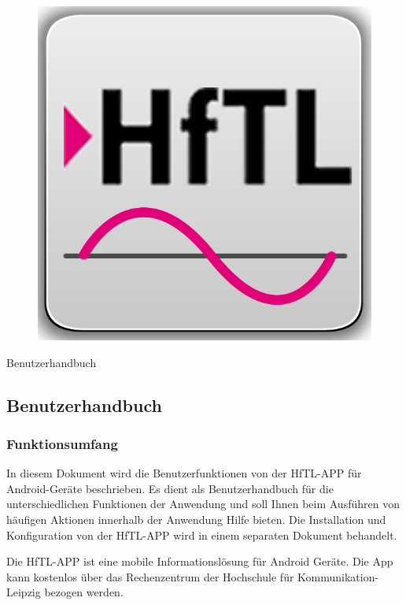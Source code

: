 \begin{figure}[h]
	\centering
	\includegraphics[scale=2.5]{03_Bedienungsanleitung/img/Logo_HFTl_App.png}
	\label{img:grafik-dummy}
\end{figure}

\begin{center}
{\huge Benutzerhandbuch}
\end{center}


\newpage
\subsection{Benutzerhandbuch}
\subsubsection{Funktionsumfang}
In diesem Dokument wird die Benutzerfunktionen von der HfTL-APP für
Android-Geräte beschrieben. Es dient als Benutzerhandbuch für die
unterschiedlichen Funktionen der Anwendung und soll Ihnen beim
Ausführen von häufigen Aktionen innerhalb der Anwendung Hilfe bieten.
Die Installation und Konfiguration von der HfTL-APP wird in einem
separaten Dokument behandelt.

Die HfTL-APP ist eine mobile Informationslösung für Android Geräte. Die App kann kostenlos über das Rechenzentrum der Hochschule für Kommunikation-Leipzig bezogen werden.

